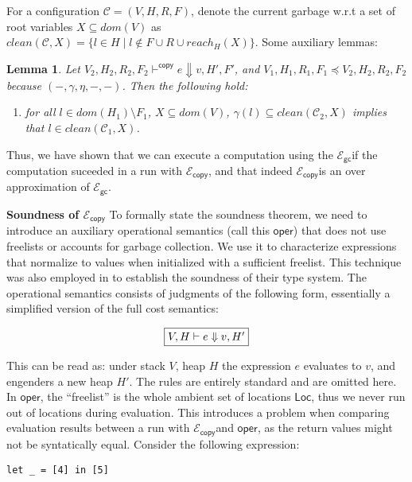 \documentclass{easychair}
\newcommand{\ms}[1]{\ensuremath{\mathsf{#1}}}
\newcounter{rule}
\newcommand{\gcSem}{\ensuremath{\mathcal{E}_{\ms{gc}}}}
\newcommand{\copySem}{\ensuremath{\mathcal{E}_{\ms{copy}}}}
\newtheorem{lemma}[theorem]{Lemma}
\theoremstyle{definition}
\begin{document}
For a configuration $\mathcal{C} = (V,H,R,F)$, denote the current garbage w.r.t a set of root variables 
$X \subseteq dom(V)$ 
as $clean(\mathcal{C},X) = \{l \in H \mid l \notin F \cup R \cup reach_H(X)\}$. Some auxiliary lemmas: 

\begin{lemma}\label{itm:aux}
Let $V_2,H_2,R_2,F_2 \vdash^{\mathsf{copy}} e \Downarrow v,H',F'$, and 
$V_1,H_1,R_1,F_1 \preceq V_2,H_2,R_2,F_2$ because $(-,\gamma,\eta,-,-)$. Then the following hold:
\begin{enumerate}
\item for all $l \in dom(H_1) \setminus F_1$, 
$X \subseteq dom(V)$, $\gamma(l) \subseteq clean(\mathcal{C}_2,X)$ implies that 
$l \in clean(\mathcal{C}_1,X)$.
\end{enumerate}
\end{lemma}

Thus, we have shown that we can execute a computation using the 
\gcSem if the computation suceeded in a run with \copySem, and that indeed 
\copySem is an over approximation of \gcSem.

\textbf{Soundness of \copySem}
\label{sect:soundcopy}
To formally state the soundness theorem,
we need to introduce an auxiliary operational semantics (call this \ms{oper}) 
that does not use freelists or accounts for garbage collection. We use
it to characterize expressions that normalize to values when initialized with a sufficient 
freelist.  This technique was also employed in \cite{Hofmann:2003:SPH:604131.604148} 
to establish the soundness of their type system. The operational semantics consists of 
judgments of the following form, essentially a simplified version of the full cost semantics:

\[
\fbox{$V,H \vdash e \Downarrow v, H'$}
\]

This can be read as: under stack $V$, heap $H$ the expression $e$ evaluates to $v$, 
and engenders a new heap $H'$. The rules are entirely standard and are omitted here.
In $\ms{oper}$, the ``freelist'' is the whole ambient set of locations $\ms{Loc}$, 
thus we never run out of locations during evaluation. This introduces a problem when comparing 
evaluation results between a run with \copySem and $\ms{oper}$, as the return values 
might not be syntatically equal. Consider the following expression:

\begin{verbatim}
let _ = [4] in [5]
\end{verbatim}
\end{document}
